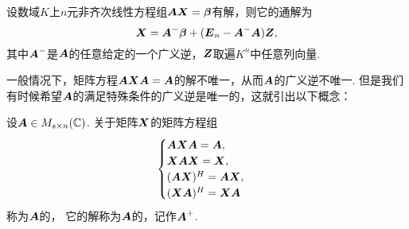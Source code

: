 \begin{corollary}\label{theorem:线性方程组.齐次线性方程组的解的结构定理.推论1}
设数域\(K\)上\(n\)元非齐次线性方程组\(\boldsymbol{A} \boldsymbol{X} = \boldsymbol\beta\)有解，则它的通解为\begin{equation}\label{equation:线性方程组.非齐次线性方程组的通解2}
	\boldsymbol{X} = \boldsymbol{A}^- \boldsymbol\beta + (\boldsymbol{E}_n - \boldsymbol{A}^- \boldsymbol{A}) \boldsymbol{Z},
\end{equation}
其中\(\boldsymbol{A}^-\)是\(\boldsymbol{A}\)的任意给定的一个广义逆，\(\boldsymbol{Z}\)取遍\(K^n\)中任意列向量.
\end{corollary}

一般情况下，矩阵方程\(\boldsymbol{A} \boldsymbol{X} \boldsymbol{A} = \boldsymbol{A}\)的解不唯一，从而\(\boldsymbol{A}\)的广义逆不唯一.
但是我们有时候希望\(\boldsymbol{A}\)的满足特殊条件的广义逆是唯一的，这就引出以下概念：
\begin{definition}
设\(\boldsymbol{A} \in M_{s \times n}(\mathbb{C})\).
关于矩阵\(\boldsymbol{X}\)的矩阵方程组\begin{equation}\label{equation:线性方程组.彭罗斯方程组}
	\begin{cases}
		\boldsymbol{A} \boldsymbol{X} \boldsymbol{A} = \boldsymbol{A}, \\
		\boldsymbol{X}\boldsymbol{A}\boldsymbol{X}=\boldsymbol{X}, \\
		(\boldsymbol{A}\boldsymbol{X})^H = \boldsymbol{A}\boldsymbol{X}, \\
		(\boldsymbol{X}\boldsymbol{A})^H = \boldsymbol{X}\boldsymbol{A}
	\end{cases}
\end{equation}
称为\(\boldsymbol{A}\)的，
它的解称为\(\boldsymbol{A}\)的，记作\(\boldsymbol{A}^+\).
\end{definition}

